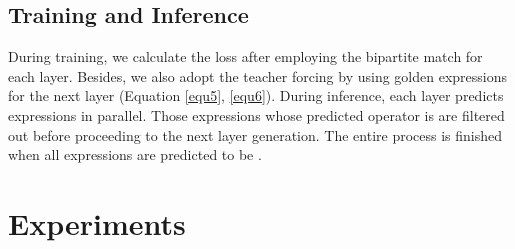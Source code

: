 \documentclass[11pt]{article}
\begin{document}
\subsection{Training and Inference}
During training, we calculate the loss after employing the bipartite match for each layer. Besides, we also adopt the teacher forcing \citep{williams1989learning} by using golden expressions for the next layer (Equation \ref{equ5}, \ref{equ6}). During inference, each layer predicts  expressions in parallel. Those expressions whose predicted operator is  are filtered out before proceeding to the next layer generation. The entire process is finished when all  expressions are predicted to be . 



\section{Experiments}
\end{document}
